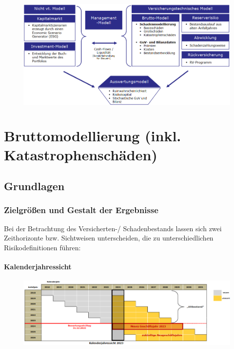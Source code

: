 \documentclass[12pt]{report}
\theoremstyle{dotless}
\theoremstyle{definition}
\begin{document}
\begin{figure}[ht]
	\centering
	\includegraphics[width=\textwidth]{Bilder/DFA.png}
\end{figure}


\chapter{Bruttomodellierung (inkl. Katastrophenschäden)}

\section{Grundlagen}

\subsection{Zielgrößen und Gestalt der Ergebnisse}
Bei der Betrachtung des Versicherten-/ Schadenbestands lassen sich zwei Zeithorizonte bzw. Sichtweisen unterscheiden, die zu unterschiedlichen Risikodefinitionen führen:

\subsubsection{Kalenderjahressicht}

\begin{figure}[ht]
	\centering
	\includegraphics[width= \textwidth]{Bilder/Kalendersicht.png}
\end{figure}
\end{document}
